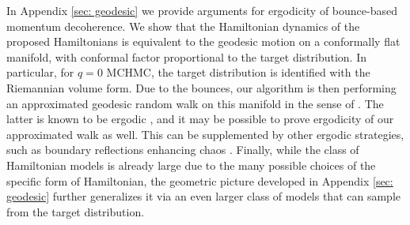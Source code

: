 \documentclass[twoside,11pt]{article}
\newcommand{\p}{\boldsymbol{\Pi}}
\newcommand{\x}{\boldsymbol{x}}
\begin{document}

In Appendix \ref{sec: geodesic} we 
provide arguments for ergodicity 
of bounce-based momentum decoherence. We show that the Hamiltonian dynamics of the proposed Hamiltonians is equivalent to the geodesic motion on a conformally flat manifold, with conformal factor proportional to the target distribution. In particular, for $q=0$ MCHMC, the target distribution is identified with the Riemannian volume form. Due to the bounces, our algorithm is then performing an approximated geodesic random walk on this manifold in the sense of \cite{Jrgensen1975TheCL}. The latter is known to be ergodic \citep{sunada1983mean}, and it may be 
possible to prove ergodicity of our approximated walk as well.
This can be supplemented by other ergodic strategies, such as boundary reflections enhancing chaos \citep{PhysRevLett.77.2941}. Finally, 
while the class of Hamiltonian 
models is already large due to the 
many possible choices of the specific 
form of Hamiltonian, 
the geometric picture developed in Appendix \ref{sec: geodesic} 
further generalizes it via  
an even larger 
class of models that can sample
from the target distribution. 


\end{document}
